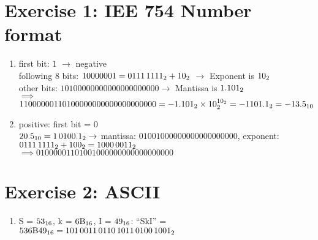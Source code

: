 \documentclass{gadsescript}
\begin{document}
\maketitle
\section*{\textbf{Exercise 1:} IEE 754 Number format}
\begin{enumerate}[label=\alph*)]
	\item first bit: $ 1 $ $ \rightarrow $ negative\\
		following $ 8 $ bits: $ 10000001 = \binnum[8]{0111 1111} + \binnum{10} $ $ \rightarrow $ Exponent is $ \binnum{10} $\\
		other bits: $ {101 0000 0000 0000 0000 0000} \rightarrow $ Mantissa is $ \binnum{1.101} $\\
		$\implies$ $1 1000 0001 10100000000000000000000 = - \binnum{1.101} \times \binnum{10}^{\binnum{10}} = -\binnum{1101.1} = -\decnum{13.5} $
	\item positive: first bit = 0\\
		$\decnum{20.5} =  \binnum{10100.1} \rightarrow $ mantissa: $ 01001000000000000000000 $, exponent: $\binnum[8]{111 1111} + \binnum{100} = \binnum[8]{1000 0011} $\\
		$\implies 0 1000 0011 010 0100 0000 0000 0000 0000$
\end{enumerate}

\section*{Exercise 2: ASCII}
\begin{enumerate}[label=\alph*)]
	\item S = $ \text{53}_{16} $, k = $ \text{6B}_{16} $, I = $ \text{49}_{16} $: ``SkI'' = $ \hexnum{536B49} = \binnum{0101 0011 0110 1011 0100 1001} $
\end{enumerate}
\end{document}
